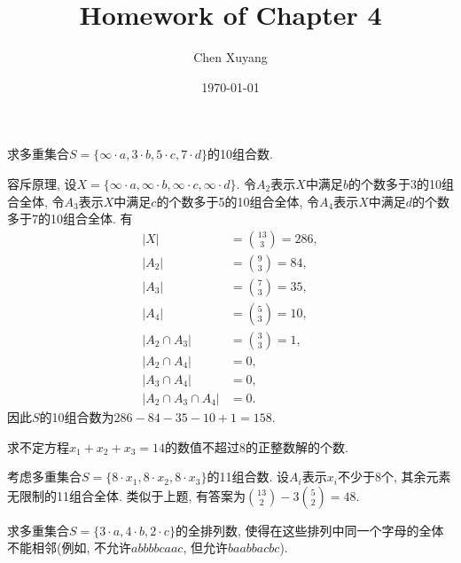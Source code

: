 \documentclass[chinese]{assignment}[2019/10/15]
\title{Homework of Chapter 4}
\author{Chen Xuyang}
\date{\today}
\institute{School of Mathematical Science}
\begin{document}
    \maketitle
    \begin{problem}
        求多重集合$S=\{\infty\cdot a, 3\cdot b, 5\cdot c, 7\cdot d\}$的10组合数.
    \end{problem}
    \begin{solution}
        容斥原理, 设$X= \{\infty\cdot a, \infty\cdot b, \infty\cdot c, \infty\cdot d\}$. 令$A_2$表示$X$中满足$b$的个数多于3的10组合全体, 令$A_3$表示$X$中满足$c$的个数多于5的10组合全体, 令$A_4$表示$X$中满足$d$的个数多于7的10组合全体. 有
        \begin{equation}
            \begin{aligned}
                |X| &= \binom {13}3 = 286,\\
                |A_2| &= \binom 93 = 84,\\
                |A_3| &= \binom 73 = 35,\\
                |A_4| &= \binom 53 = 10,\\
                |A_2 \cap A_3| &= \binom 33 = 1,\\
                |A_2 \cap A_4| &= 0,\\
                |A_3 \cap A_4| &= 0,\\
                |A_2 \cap A_3 \cap A_4| &= 0.
            \end{aligned}
        \end{equation}
        因此$S$的10组合数为$286-84-35-10+1=158$.
    \end{solution}
    \begin{problem}
        求不定方程$x_1+x_2+x_3=14$的数值不超过8的正整数解的个数.
    \end{problem}
    \begin{solution}
        考虑多重集合$S = \{8\cdot x_1, 8\cdot x_2, 8\cdot x_3\}$的11组合数. 设$A_i$表示$x_i$不少于8个, 其余元素无限制的11组合全体. 类似于上题, 有答案为$\binom {13}2 - 3\binom 52 = 48$.
    \end{solution}
    \begin{problem}
        求多重集合$S=\{3\cdot a, 4\cdot b, 2\cdot c\}$的全排列数, 使得在这些排列中同一个字母的全体不能相邻(例如, 不允许$abbbbcaac$, 但允许$baabbacbc$).
    \end{problem}
\end{document}
